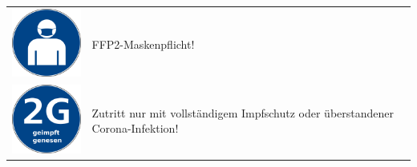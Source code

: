 \documentclass[24pt, a4paper, portrait]{article}
\begin{document}
\begin{tabular}{ m{3.7cm} m{12.5cm} }
    \vspace{2mm}
    \includegraphics[width=3cm]{maskenpflicht} & FFP2-Maskenpflicht! \\
    \vspace{2mm}
    \includegraphics[width=3cm]{2g} & Zutritt nur mit vollständigem Impfschutz oder überstandener Corona-Infektion! \\
\end{tabular}
\end{document}
